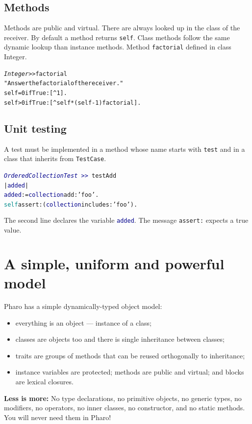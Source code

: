 \documentclass[notumble]{leaflet}
\makeatletter
\newcommand{\ct}[1]{{\textsf{#1}}\xspace}
\newenvironment{displaycode}{%
     \par
     \hspace{1.5em}\begin{minipage}{\linewidth}
       \begin{alltt}\small}{
       \end{alltt}
     \end{minipage}
     \par}
\newcommand{\code}[1]{\foreignlanguage{english}{\texttt{#1}}}
\makeatother
\begin{document}
\vspace{-0.3cm}
\subsection{Methods}
Methods are public and virtual. There are always looked up in the class of the receiver. By default a method returns \code{self}. 
Class methods follow the same dynamic lookup than instance methods. 
Method \code{factorial} defined in class \ct{Integer}. 

\begin{displaycode}
\textit{Integer >>} factorial
   "Answer the factorial of the receiver."
   self = 0 ifTrue: [^ 1].
   self > 0 ifTrue: [^ self * (self - 1) factorial].
\end{displaycode}



\vspace{-0.3cm}
\subsection{Unit testing}
A test must be implemented in a method whose name starts with \code{test} and in a class that
inherits from \code{TestCase}.

\begin{displaycode}
\textcolor{darkBlue}{\textit{OrderedCollectionTest}\,>>}\,testAdd
  | \textcolor{darkBlue}{added} |
  \textcolor{darkBlue}{added} := \textcolor{darkBlue}{collection} add: \textcolor{string}{'foo'}.
  \textcolor{darkCyan}{self} assert: (\textcolor{darkBlue}{collection} includes: \textcolor{string}{'foo'}).
\end{displaycode}

The second line declares the variable \code{\textcolor{darkBlue}{added}}. The message \code{assert:} expects a true value.
\vspace{-0.3cm}
\section{A simple, uniform and powerful model}

Pharo has a simple dynamically-typed object model:
\begin{itemize}
\item everything is an object --- instance of a class;
\item classes are objects too and there is single inheritance between classes;
\item traits are groups of methods that can be reused orthogonally to inheritance;
\item instance variables are protected; methods are public and virtual;
and blocks are lexical closures.
\end{itemize}

\textbf{Less is more:}  No type declarations, no primitive
objects, no generic types, no modifiers, no operators, no inner
classes, no constructor, and no static methods. You will never need them in
Pharo!



\end{document}
